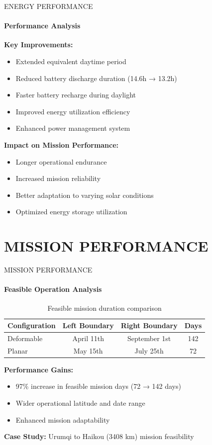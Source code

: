 \documentclass{beamer}
\begin{document}
\begin{frame}{ENERGY PERFORMANCE}
    \framesubtitle{Performance Analysis}
    
    \textbf{Key Improvements:}
    \begin{itemize}
        \item Extended equivalent daytime period
        \item Reduced battery discharge duration (14.6h → 13.2h)
        \item Faster battery recharge during daylight
        \item Improved energy utilization efficiency
        \item Enhanced power management system
    \end{itemize}
    
    \vspace{0.5cm}
    \textbf{Impact on Mission Performance:}
    \begin{itemize}
        \item Longer operational endurance
        \item Increased mission reliability
        \item Better adaptation to varying solar conditions
        \item Optimized energy storage utilization
    \end{itemize}
\end{frame}

\section{MISSION PERFORMANCE} 
\begin{frame}{MISSION PERFORMANCE}
    \framesubtitle{Feasible Operation Analysis}
    
    \begin{table}
        \centering
        \begin{tabular}{|l|c|c|c|}
            \hline
            \textbf{Configuration} & \textbf{Left Boundary} & \textbf{Right Boundary} & \textbf{Days} \\
            \hline
            Deformable & April 11th & September 1st & 142 \\
            Planar & May 15th & July 25th & 72 \\
            \hline
        \end{tabular}
        \caption{Feasible mission duration comparison}
    \end{table}
    
    \textbf{Performance Gains:}
    \begin{itemize}
        \item 97\% increase in feasible mission days (72 → 142 days)
        \item Wider operational latitude and date range
        \item Enhanced mission adaptability
    \end{itemize}
    
    \textbf{Case Study:} Urumqi to Haikou (3408 km) mission feasibility
\end{frame}
\end{document}
